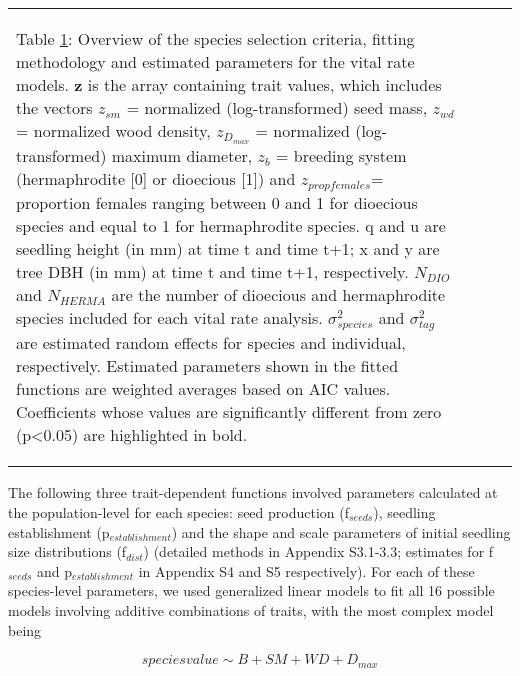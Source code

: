 \documentclass[b5paper,justified]{tufte-book} %
\begin{document}
\begin{fullwidth}
\begin{landscape}
\begin{longtable}{@{}p{6cm}p{6cm}p{6cm}p{1cm}}
\bottomrule
\hspace*{0cm}\begin{minipage}{20.5cm}
\vspace{0.2cm}
Table \ref{tab:chap6tab1}: Overview of the species selection criteria, fitting methodology and estimated parameters for the vital rate models. \textbf{z} is the array containing trait values, which includes the vectors  $z_{sm}$ = normalized (log-transformed) seed mass, $z_{wd}$ = normalized wood density, $z_{D_{max}}$ = normalized (log-transformed) maximum diameter, $z_{b}$ = breeding system (hermaphrodite [0] or dioecious [1]) and $z_{prop females}$= proportion females ranging between 0 and 1 for dioecious species and equal to 1 for hermaphrodite species. q and u are seedling height (in mm) at time t and time t+1; x and y are tree DBH (in mm) at time t and time t+1, respectively. $N_{DIO}$ and $N_{HERMA}$ are the number of dioecious and hermaphrodite species included for each vital rate analysis. $\sigma^2_{species}$ and $\sigma^2_{tag}$ are estimated random effects for species and individual, respectively. Estimated parameters shown in the fitted functions are weighted averages based on AIC values. Coefficients whose values are significantly different from zero (p<0.05) are highlighted in bold.
\end{minipage} 
\label{tab:chap6tab1}\\

\end{longtable}
\end{landscape}



The following three trait-dependent functions involved parameters calculated at the population-level for each species: seed production (f$_{seeds}$), seedling establishment (p$_{establishment}$) and the shape and scale parameters of initial seedling size distributions (f$_{dist}$) (detailed methods in Appendix S3.1-3.3; estimates for f$_{seeds}$ and p$_{establishment}$ in Appendix S4 and S5 respectively). For each of these species-level parameters, we used generalized linear models to fit all 16 possible models involving additive combinations of traits, with the most complex model being 

\begin{equation}
species value \sim B + SM + WD + D_{max}
\label{eq:chap6eq7}
\end{equation}


\end{fullwidth}
\end{document}
